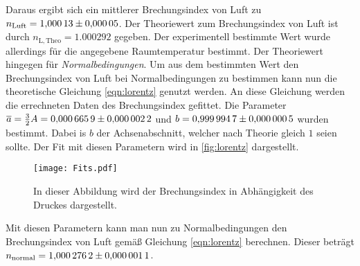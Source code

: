 Daraus ergibt sich ein mittlerer Brechungsindex von Luft zu $n_\mathrm{Luft} = \num{1.00013 \pm 0.00005}$. Der Theoriewert zum Brechungsindex von Luft ist durch $n_{\mathrm{L,Theo}} = 1.000292$ \cite{Ingenieurwissen}
gegeben. Der experimentell bestimmte Wert wurde allerdings für die angegebene Raumtemperatur bestimmt. Der Theoriewert hingegen für \textit{Normalbedingungen}. Um aus dem bestimmten 
Wert den Brechungsindex von Luft bei Normalbedingungen zu bestimmen kann nun die theoretische Gleichung \ref{eqn:lorentz} genutzt werden. An diese Gleichung werden die errechneten 
Daten des Brechungsindex gefittet. Die Parameter $\overline{a} = \frac{3}{2}A = \num{0.0006659 \pm 0.0000022}$ und $b = \num{0.9999947 \pm 0.0000005}$ wurden bestimmt. Dabei is $b$
der Achsenabschnitt, welcher nach Theorie gleich $1$ seien sollte. Der Fit mit diesen Parametern wird in \autoref{fig:lorentz} dargestellt.

\begin{figure}
  \centering
  \texttt{[image: Fits.pdf]}
  \caption{In dieser Abbildung wird der Brechungsindex in Abhängigkeit des Druckes dargestellt.}
  \label{fig:lorentz}
\end{figure}

Mit diesen Parametern kann man nun zu Normalbedingungen den Brechungsindex von Luft gemäß Gleichung \ref{eqn:lorentz} berechnen. Dieser beträgt $n_\mathrm{normal} = \num{1.0002762 \pm 0.0000011}$.
